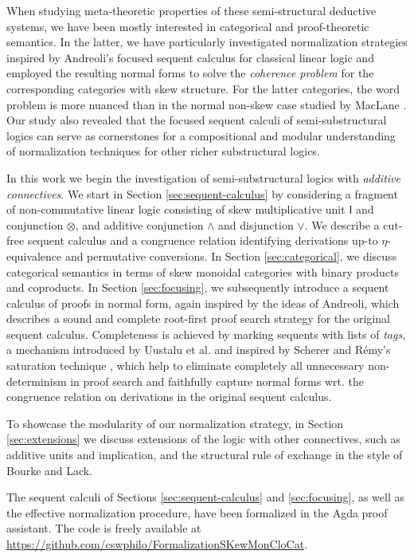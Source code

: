 \documentclass[submission,copyright,creativecommons]{eptcs}
\theoremstyle{definition}
\newcommand{\ot}{\otimes}
\newcommand{\I}{\mathsf{I}}
\begin{document}
When studying meta-theoretic properties of these semi-structural deductive systems, we have been mostly interested in categorical and proof-theoretic semantics. In the latter, we have particularly investigated normalization strategies inspired by Andreoli's focused sequent calculus for classical linear logic \cite{andreoli:logic:1992} and employed the resulting normal forms to solve the \emph{coherence problem} for the corresponding categories with skew structure. For the latter categories, the word problem is more nuanced than in the normal non-skew case studied by MacLane \cite{maclane1963natural}. Our study also revealed that the focused sequent calculi of semi-substructural logics can serve as cornerstones for a compositional and modular understanding of normalization techniques for other richer substructural logics.

In this work we begin the investigation of  semi-substructural logics with \emph{additive connectives}. We start in Section \ref{sec:sequent-calculus} by considering a fragment of non-commutative linear logic consisting of skew multiplicative unit $\I$ and conjunction $\ot$, and additive conjunction $\land$ and disjunction $\lor$. We describe a cut-free sequent calculus and a congruence relation identifying derivations up-to $\eta$-equivalence and permutative conversions. In Section \ref{sec:categorical}, we discuss categorical semantics in terms of skew monoidal categories with binary products and coproducts. In Section \ref{sec:focusing}, we subsequently introduce a sequent calculus of proofs in normal form, again inspired by the ideas of Andreoli, which describes a sound and complete root-first proof search strategy for the original sequent calculus. Completeness is achieved by marking sequents with lists of \emph{tags}, a mechanism introduced by Uustalu et al. \cite{UVW:protsn} and inspired by Scherer and R{\'e}my's saturation technique \cite{scherer:simple:2015}, which help to  eliminate completely all unnecessary non-determinism in proof search and faithfully capture normal forms wrt. the congruence relation on derivations in the original sequent calculus. %

To showcase the modularity of our normalization strategy, in Section \ref{sec:extensions} we discuss extensions of the logic with other connectives, such as additive units and implication, and the structural rule of exchange in the style of Bourke and Lack.

The sequent calculi of Sections \ref{sec:sequent-calculus} and \ref{sec:focusing}, as well as the effective normalization procedure, have been formalized in the Agda proof assistant. The code is freely available at
  \url{https://github.com/cswphilo/FormalizationSKewMonCloCat}.
\end{document}
